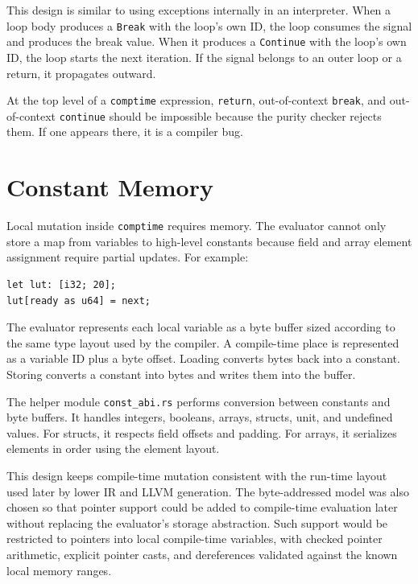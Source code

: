 This design is similar to using exceptions internally in an interpreter. When a
loop body produces a \texttt{Break} with the loop's own ID, the loop consumes the
signal and produces the break value. When it produces a \texttt{Continue} with
the loop's own ID, the loop starts the next iteration. If the signal belongs to
an outer loop or a return, it propagates outward.

At the top level of a \texttt{comptime} expression, \texttt{return},
out-of-context \texttt{break}, and out-of-context \texttt{continue} should be
impossible because the purity checker rejects them. If one appears there, it is
a compiler bug.

\section{Constant Memory}

Local mutation inside \texttt{comptime} requires memory. The evaluator cannot
only store a map from variables to high-level constants because field and array
element assignment require partial updates. For example:

\begin{lstlisting}[language=EPL,caption={Partial compile-time mutation}]
let lut: [i32; 20];
lut[ready as u64] = next;
\end{lstlisting}

The evaluator represents each local variable as a byte buffer sized according to
the same type layout used by the compiler. A compile-time place is represented
as a variable ID plus a byte offset. Loading converts bytes back into a constant.
Storing converts a constant into bytes and writes them into the buffer.

The helper module \texttt{const\_abi.rs} performs conversion between constants
and byte buffers. It handles integers, booleans, arrays, structs, unit, and
undefined values. For structs, it respects field offsets and padding. For arrays,
it serializes elements in order using the element layout.

This design keeps compile-time mutation consistent with the run-time layout used
later by lower IR and LLVM generation.
The byte-addressed model was also chosen so that pointer support could be added
to compile-time evaluation later without replacing the evaluator's storage
abstraction. Such support would be restricted to pointers into local
compile-time variables, with checked pointer arithmetic, explicit pointer casts,
and dereferences validated against the known local memory ranges.

